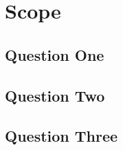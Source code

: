 \chapter{Scope}
\label{ch:scope}


\section{Question One}
\label{sec:scope:q1}


\section{Question Two}
\label{sec:scope:q2}


\section{Question Three}
\label{sec:scope:q3}

